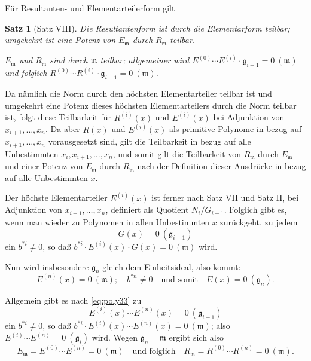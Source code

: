 \documentclass[fontsize=10pt,paper=a5,pagesize,headings=small]{scrbook}
\newcommand{\ideal}[1]{\mathfrak{#1}}
\theoremstyle{plain}
\newtheorem*{satz}{Satz}
\begin{document}
Für Resultanten- und Elementarteilerform gilt

\begin{satz}[Satz VIII]
Die Resultantenform ist durch die Elementarform teilbar; umgekehrt ist eine Potenz
von $E_{\ideal{m}}$ durch $R_{\ideal{m}}$ teilbar.

$E_{\ideal{m}}$ und $R_{\ideal{m}}$ sind durch $\ideal{m}$ teilbar; allgemeiner wird $E^{(0)} \cdots E^{(i)} \cdot \ideal{g}_{i-1} = 0\ (\ideal{m})$
und folglich $R^{(0)} \cdots R^{(i)} \cdot \ideal{g}_{i-1} = 0\ (\ideal{m})$.
\end{satz}

Da nämlich die Norm durch den höchsten Elementarteiler teilbar ist und umgekehrt
eine Potenz dieses höchsten Elementarteilers durch die Norm teilbar ist, folgt diese
Teilbarkeit für $R^{(i)}(x)$ und $E^{(i)}(x)$ bei Adjunktion von $x_{i+1},\dots,x_n$. Da aber
$R(x)$ und $E^{(i)}(x)$ als primitive Polynome in bezug auf $x_{i+1},\dots,x_n$ vorausgesetzt sind,
gilt die Teilbarkeit in bezug auf alle Unbestimmten $x_i, x_{i+1},\dots,x_n$, und somit gilt die
Teilbarkeit von $R_{\ideal{m}}$ durch $E_{\ideal{m}}$ und einer Potenz von $E_{\ideal{m}}$ durch $R_{\ideal{m}}$ nach der Definition
dieser Ausdrücke in bezug auf alle Unbestimmten $x$.

\newpage
\setcounter{page}{442}

Der höchste Elementarteiler $E^{(i)}(x)$ ist ferner nach Satz VII und Satz II, bei
Adjunktion von $x_{i+1},\dots,x_n$, definiert als Quotient $N_i/G_{i-1}$. Folglich gibt es, wenn
man wieder zu Polynomen in allen Unbestimmten $x$ zurückgeht, zu jedem
\begin{equation}
\label{eq:poly33}
G(x) = 0\ (\ideal{g}_{i-1})
\end{equation}
ein $b^{*i} \neq 0$, so daß $b^{*i} \cdot E^{(i)}(x) \cdot G(x) = 0\ (\ideal{m})$ wird.

Nun wird insbesondere $\ideal{g}_n$ gleich dem Einheitsideal, also kommt:
\[ E^{(n)}(x) = 0\ (\ideal{m});\quad b^{*n} \neq 0\quad \text{und somit}\quad E(x) = 0\ (\ideal{g}_n). \]

Allgemein gibt es nach \eqref{eq:poly33} zu
\[ E^{(i)}(x) \cdots E^{(n)}(x) = 0\ (\ideal{g}_{i-1}) \]
ein $b^{*i} \neq 0$, so daß $b^{*i} \cdot E^{(i)}(x) \cdots E^{(n)}(x) = 0\ (\ideal{m})$; also
$E^{(i)} \cdots E^{(n)} = 0\ (\ideal{g}_i)$ wird. Wegen $\ideal{g}_n = \ideal{m}$ ergibt sich also
\begin{equation}
\label{eq:poly34}
E_{\ideal{m}} = E^{(0)} \cdots E^{(n)} = 0\ (\ideal{m})\quad \text{und folglich}\quad R_{\ideal{m}} = R^{(0)} \cdots R^{(n)} = 0\ (\ideal{m}).
\end{equation}
\end{document}
